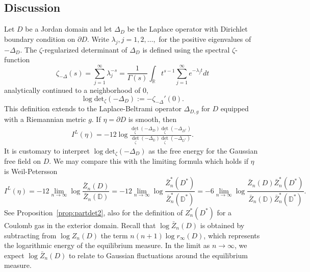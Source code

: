 \documentclass{article}
\numberwithin{equation}{section}
\numberwithin{figure}{section}
\theoremstyle{plain}
\theoremstyle{plain}
\numberwithin{thm}{section}
\theoremstyle{remark}
\newcommand{\R}{\mathbb{R}}
\newcommand{\D}{\mathbb{D}}
\begin{document}
\subsection{Discussion}\label{sect:discussion}
Let $D$ be a Jordan domain and let $\Delta_D$ be the Laplace operator with Dirichlet boundary condition on $\partial D$. Write $\lambda_j, j =1,2,\ldots,$ for the positive eigenvalues of $-\Delta_D$. The $\zeta$-regularized determinant of $\Delta_{D}$ is defined using the spectral $\zeta$-function \[\zeta_{-\Delta}(s) = \sum_{j=1}^\infty \lambda_j^{-s} = \frac{1}{\Gamma(s)} \int_\R t^{s-1} \sum_{j=1}^\infty e^{-\lambda_j t}  dt\] analytically continued to a neighborhood of $0$,
\[
\log \textrm{det}_{\zeta} (-\Delta_{D}) := -\zeta_{-\Delta}'(0).
\]
This definition extends to the Laplace-Beltrami operator $\Delta_{D,g}$ for $D$ equipped with a Riemannian metric $g$. If $\eta = \partial D$ is smooth, then \cite{Wa}
\begin{align}\label{def:Loewner-energy-determinant}
I^L(\eta) = -12 \log \frac{\det_{\zeta}(-\Delta_{D})\det_{\zeta}(-\Delta_{D^*})}{\det_{\zeta}(-\Delta_{\D})\det_{\zeta}(-\Delta_{\D^*})}.
\end{align}   
 It is customary to interpret $\log \textrm{det}_{\zeta} (-\Delta_{D})$ as the free energy for the Gaussian free field on $D$. 
We may compare this with the limiting formula which holds if $\eta$ is Weil-Petersson
\[
I^L(\eta) = -12 \lim_{n \to \infty} \log \frac{\bar Z_n(D)}{\bar Z_n(\D)}  = -12 \lim_{n \to \infty} \log \frac{\bar Z_n^*(D^*)}{\bar Z_n^*(\D^*)} =  -6 \lim_{n \to \infty} \log \frac{\bar Z_n(D) \bar Z_n^*(D^*)}{\bar Z_n(\D) \bar Z_n^*(\D^*)}.\]
See Proposition~\ref{prop:partdet2}, also for the definition of $Z^*_n(D^*)$ for a Coulomb gas in the exterior domain.
Recall that $\log \bar{Z}_n(D)$ is obtained by subtracting from $\log Z_n(D)$ the term $n(n+1) \log r_\infty(D)$, which represents the logarithmic energy of the equilibrium measure. In the limit as $n \to \infty$, we expect $\log \bar{Z}_n(D)$ to relate to Gaussian fluctuations around the equilibrium measure. 
\end{document}
